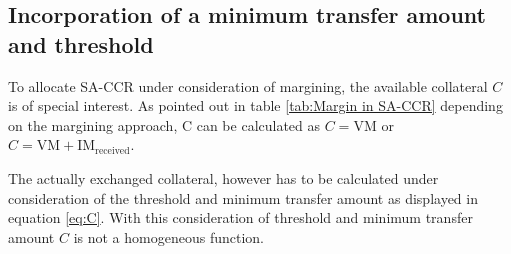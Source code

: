 \documentclass[../Thesis_AHoecherl.tex]{subfiles}
\begin{document}
    
    

    \subsection{Incorporation of a minimum transfer amount and threshold}\label{sec:Incorporation of a minimum transfer amount and threshold}

    To allocate \gls{SA-CCR} under consideration of margining, the available collateral $C$ is of special interest. As pointed out in table \ref{tab:Margin in SA-CCR} depending on the margining approach, C can be calculated as $C = \text{VM}$ or $C = \text{VM} + \text{IM}_{\text{received}}$. 
    
    The actually exchanged collateral, however has to be calculated under consideration of the threshold and minimum transfer amount as displayed in equation \ref{eq:C}. With this consideration of threshold and minimum transfer amount $C$ is not a homogeneous function. 
\end{document}

